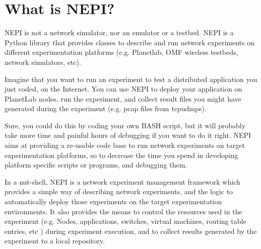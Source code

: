 %
%
%
%
%
%

\section{What is NEPI?}

NEPI is not a network simulator, nor an emulator or a testbed. 
NEPI is a Python library that provides classes to describe and 
run network experiments on different experimentation platforms
(e.g. Planetlab, OMF wireless testbeds, network simulators, etc).

Imagine that you want to run an experiment to test a distributed 
application you just coded, on the Internet. 
You can use NEPI to deploy your application on PlanetLab
nodes, run the experiment, and collect result files
you might have generated during the
experiment (e.g. pcap files from tcpudmps).

Sure, you could do this by coding your own BASH script, but 
it will probably take more time and painful hours of debugging
if you want to do it right.
NEPI aims at providing a re-usable code base to run network 
experiments on target experimentation platforms, so to 
decrease the time  you spend in developing platform specific 
scripts or programs, and debugging them. 

In a nut-shell, NEPI is a network experiment 
management framework which provides a simple way of 
describing network experiments, and the logic to automatically
deploy those experiments on the target experimentation environments.
It also provides the means to control the resources used in the experiment
(e.g. Nodes, applications, switches, virtual machines, routing table entries, 
etc ) during experiment execution, and to collect results generated by
the experiment to a local repository.


